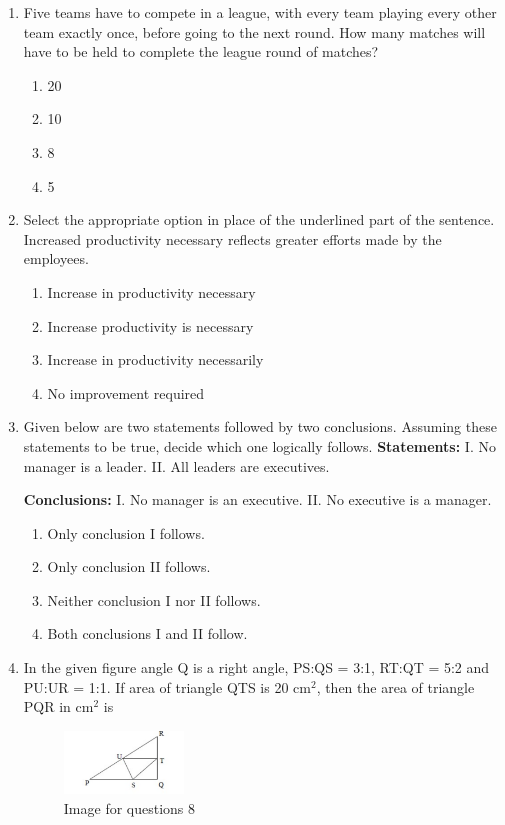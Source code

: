 \documentclass[journal,12pt,onecolumn]{IEEEtran}
\theoremstyle{remark}
\begin{document}
\begin{enumerate}
\item Five teams have to compete in a league, with every team playing every other team exactly once, before going to the next round.  
How many matches will have to be held to complete the league round of matches?  
\begin{multicols}{4}
\begin{enumerate}
\item 20  
\item 10  
\item 8  
\item 5  
\end{enumerate}
\end{multicols}

\item Select the appropriate option in place of the underlined part of the sentence.  
Increased productivity necessary reflects greater efforts made by the employees.  
\begin{enumerate}
\item Increase in productivity necessary  
\item Increase productivity is necessary  
\item Increase in productivity necessarily  
\item No improvement required  
\end{enumerate}

\item Given below are two statements followed by two conclusions. Assuming these statements to be true, decide which one logically follows.  
\textbf{Statements:}  
I. No manager is a leader.  
II. All leaders are executives.  

\textbf{Conclusions:}  
I. No manager is an executive.  
II. No executive is a manager.  
\begin{enumerate}
\item Only conclusion I follows.  
\item Only conclusion II follows.  
\item Neither conclusion I nor II follows.  
\item Both conclusions I and II follow.  
\end{enumerate}

\item In the given figure angle Q is a right angle, PS:QS = 3:1, RT:QT = 5:2 and PU:UR = 1:1.  
If area of triangle QTS is 20 cm\(^2\), then the area of triangle PQR in cm\(^2\) is  

\begin{figure}[H]
    \centering
    \includegraphics[width=0.3\textwidth]{figs/fig1.png}
    \caption{Image for questions 8}
    \label{fig:question8}
\end{figure}


\end{enumerate}
\end{document}
